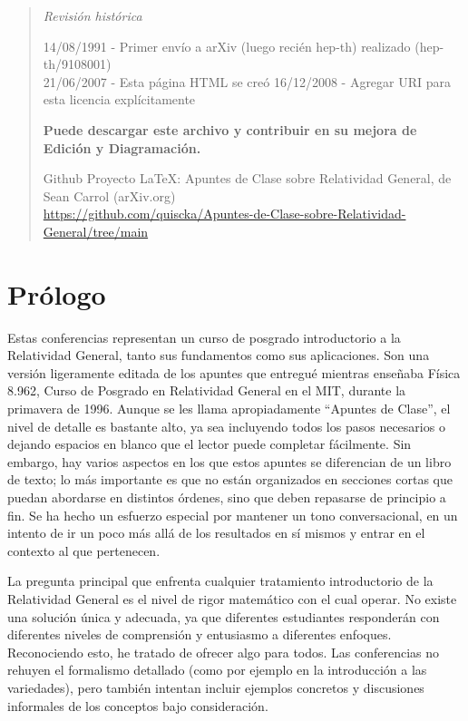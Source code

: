 \documentclass[11pt,b5paper,openany,twoside]{book}
\begin{document}
\begin{quote}
{\textit{Revisión histórica}

14/08/1991 - Primer envío a arXiv (luego recién hep-th) realizado (hep-th/9108001)\\
21/06/2007 - Esta página HTML se creó 16/12/2008 - Agregar URI para esta licencia explícitamente
}

\textbf{Puede descargar este archivo y contribuir en su mejora de Edición y Diagramación. }

Github Proyecto LaTeX: Apuntes de Clase sobre Relatividad General, de Sean Carrol (arXiv.org)\\ \href{https://github.com/quiscka/Apuntes-de-Clase-sobre-Relatividad-General/tree/main}{https://github.com/quiscka/Apuntes-de-Clase-sobre-Relatividad-General/tree/main}
\end{quote}



{\normalfont\fontsize{9.4pt}{1em}\selectfont
    \thispagestyle{plain}
    \begin{quote}
        \tableofcontents
        \thispagestyle{plain}
    \end{quote}
    \normalfont\selectfont}


\mainmatter


\chapter*{Prólogo}

Estas conferencias representan un curso de posgrado introductorio a la Relatividad General, tanto sus fundamentos como sus aplicaciones.
Son una versión ligeramente editada de los apuntes que entregué mientras enseñaba Física 8.962, Curso de Posgrado en Relatividad General en el MIT, durante la primavera de 1996.
Aunque se les llama apropiadamente ``Apuntes de Clase'', el nivel de detalle es bastante alto, ya sea incluyendo todos los pasos necesarios o dejando espacios en blanco que el lector puede completar fácilmente.
Sin embargo, hay varios aspectos en los que estos apuntes se diferencian de un libro de texto; lo más importante es que no están organizados en secciones cortas que puedan abordarse en distintos órdenes, sino que deben repasarse de principio a fin.
Se ha hecho un esfuerzo especial por mantener un tono conversacional, en un intento de ir un poco más allá de los resultados en sí mismos y entrar en el contexto al que pertenecen.

La pregunta principal que enfrenta cualquier tratamiento introductorio de la Relatividad General es el nivel de rigor matemático con el cual operar.
No existe una solución única y adecuada, ya que diferentes estudiantes responderán con diferentes niveles de comprensión y entusiasmo a diferentes enfoques.
Reconociendo esto, he tratado de ofrecer algo para todos.
Las conferencias no rehuyen el formalismo detallado (como por ejemplo en la introducción a las variedades), pero también intentan incluir ejemplos concretos y discusiones informales de los conceptos bajo consideración.
\end{document}
